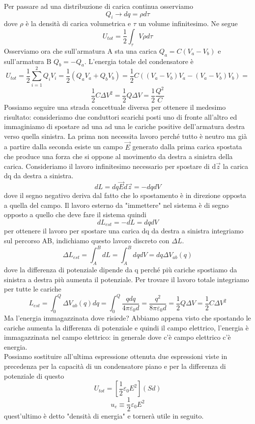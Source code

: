 \documentclass[10pt,a4paper]{article}
\begin{document}
Per passare ad una distribuzione di carica continua osserviamo
\[Q_i \to dq = \rho d\tau\]
dove $\rho$ è la densità di carica volumetrica e $\tau$ un volume infinitesimo. Ne segue
\[U_{tot} = \frac{1}{2}\int_{\tau} V\rho d\tau\]
Osserviamo ora che sull'armatura A sta una carica \(Q_a = C(V_a - V_b)\) e sull'armatura B \(Q_b = - Q_a\). L'energia totale del condensatore è
\[U_{tot} = \frac{1}{2}\sum_{i=1}^{2} Q_i V_i = \frac{1}{2} (Q_a V_a + Q_b V_b)= \frac{1}{2}C((V_a - V_b) V_a - (V_a - V_b) V_b) = \]
\[\frac{1}{2}C\Delta V^2 = \frac{1}{2}Q\Delta V = \frac{1}{2}\frac{Q^2}{C}\]
Possiamo seguire una strada concettuale diversa per ottenere il medesimo risultato: consideriamo due conduttori scarichi posti uno di fronte all'altro ed immaginiamo di spostare ad una ad una le cariche positive dell'armatura destra verso quella sinistra. La prima non necessita lavoro perché tutto è neutro ma già a partire dalla seconda esiste un campo $\vec{E}$ generato dalla prima carica spostata che produce una forza che si oppone al movimento da destra a sinistra della carica. Consideriamo il lavoro infinitesimo necessario per spostare di d$\vec{z}$ la carica dq da destra a sinistra. 
\[dL = dq\vec{E}d\vec{z} = -dqdV \]
dove il segno negativo deriva dal fatto che lo spostamento è in direzione opposta a quella del campo. Il lavoro esterno da "immettere" nel sistema è di segno opposto a quello che deve fare il sistema quindi
\[dL_{est} = -dL = dqdV\]
per ottenere il lavoro per spostare una carica dq da destra a sinistra integriamo sul percorso AB, indichiamo questo lavoro discreto con \(\Delta L\).
\[\Delta L_{est} = \int_{A}^{B} dL = \int_{A}^{B} dqdV = dq \Delta V_{ab}(q) \]
dove la differenza di potenziale dipende da q perché più cariche spostiamo da sinistra a destra più aumenta il potenziale. Per trovare il lavoro totale integriamo per tutte le cariche
\[L_{est} = \int_0^Q  \Delta V_{ab}(q) dq= \int_0^Q \frac{qdq}{4\pi\varepsilon_0 d} = \frac{q^2}{8\pi\varepsilon_0 d} = \frac{1}{2}Q\Delta V = \frac{1}{2} C \Delta V^2\]
Ma l'energia immagazzinata dove risiede? Abbiamo appena visto che spostando le cariche aumenta la differenza di potenziale e quindi il campo elettrico, l'energia è immagazzinata nel campo elettrico: in generale dove c'è campo elettrico c'è energia.\\
Possiamo sostituire all'ultima espressione ottenuta due espressioni viste in precedenza per la capacità di un condensatore piano e per la differenza di potenziale di questo 
\[U_{tot} = [\frac{1}{2}\varepsilon_0 E^2](Sd) \]
\[u_e \equiv \frac{1}{2}\varepsilon_0 E^2\]
quest'ultimo è detto "densità di energia" e tornerà utile in seguito. 
\end{document}
